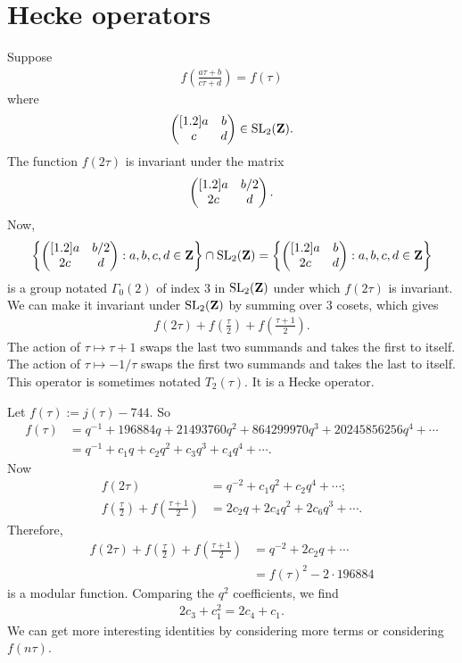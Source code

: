 \documentclass[11pt, oneside,margin=1in]{article}
\begin{document}
\section{Hecke operators}
Suppose
\begin{align*}
	f\left( \frac{a\tau + b}{c\tau + d} \right) = f(\tau)
\end{align*}
where
\begin{align*}
	\begin{pmatrix} [ 1.2 ] a&b\\c&d\end{pmatrix} \in \operatorname{SL}_{2}(\mathbf{Z}).
\end{align*}
The function $f(2\tau)$ is invariant under the matrix
\begin{align*}
	\begin{pmatrix} [ 1.2 ] a&b/2\\2c&d\end{pmatrix}.
\end{align*}
Now,
\begin{align*}
	\left\{ \begin{pmatrix} [ 1.2 ] a&b/2\\2c&d\end{pmatrix} : a,b,c,d\in \mathbf{Z} \right\} \cap \operatorname{SL}_{2}(\mathbf{Z}) = \left\{ \begin{pmatrix} [ 1.2 ] a&b\\2c&d\end{pmatrix} : a,b,c,d\in \mathbf{Z} \right\} 
\end{align*}
is a group notated $\Gamma_0(2)$ of index $3$ in $\operatorname{SL}_{2}(\mathbf Z)$ under which $f(2\tau)$ is invariant. We can make it invariant under $\operatorname{SL}_{2}(\mathbf Z)$ by summing over $3$ cosets, which gives
\begin{align*}
	f(2\tau) + f \left( \frac{\tau}{2} \right) + f\left( \frac{\tau+1}{2} \right) .
\end{align*}
The action of $\tau \longmapsto \tau+1$ swaps the last two summands and takes the first to itself. The action of $\tau \longmapsto -1/\tau$ swaps the first two summands and takes the last to itself. This operator is sometimes notated $T_2(\tau)$. It is a Hecke operator.

\begin{example}[ ]\label{}\text{}
Let $f(\tau) := j (\tau) - 744$. So
\begin{align*}
	f(\tau) &= q ^{-1} + 196884 q + 21493760 q^2 + 864299970q^3 + 20245856256q^4 + \cdots\\
	&= q^{-1} + c_1q + c_2q^2 + c_3q^3 + c_4q^4 + \cdots.
\end{align*}
Now
\begin{align*}
	f(2\tau) &= q^{-2} +  c_1q^2 + c_2q^4 + \cdots;\\
	f \left( \frac{\tau}{2} \right) + f\left( \frac{\tau + 1}{2} \right) &= 2c_2q + 2c_4q^2 + 2c_6q^3 + \cdots .
\end{align*}
Therefore,
\begin{align*}
	f(2\tau) + f \left( \frac{\tau}{2} \right) + f\left( \frac{\tau + 1}{2} \right) &= q^{-2} + 2c_2q + \cdots\\
											&= f(\tau)^2 - 2\cdot 196884
\end{align*}
is a modular function. Comparing the $q^2$ coefficients, we find
\begin{align*}
	2c_3 + c_1^2 = 2c_4 + c_1.
\end{align*}
We can get more interesting identities by considering more terms or considering $f(n\tau)$.
\end{example}
\end{document}
